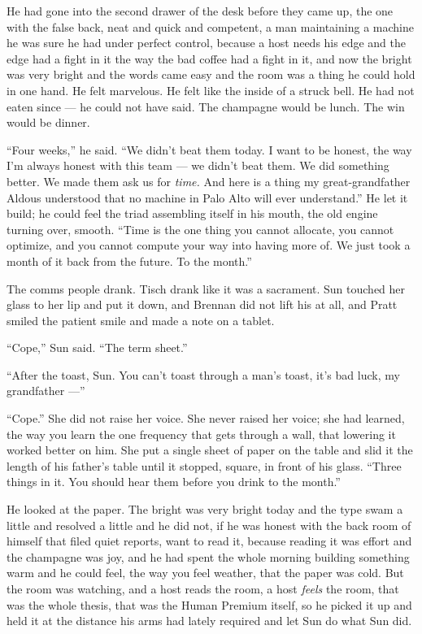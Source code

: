 \documentclass[11pt,openany]{book}
\begin{document}
He had gone into the second drawer of the desk before they came up, the one with the false back, neat and quick and competent, a man maintaining a machine he was sure he had under perfect control, because a host needs his edge and the edge had a fight in it the way the bad coffee had a fight in it, and now the bright was very bright and the words came easy and the room was a thing he could hold in one hand. He felt marvelous. He felt like the inside of a struck bell. He had not eaten since --- he could not have said. The champagne would be lunch. The win would be dinner.

``Four weeks,'' he said. ``We didn't beat them today. I want to be honest, the way I'm always honest with this team --- we didn't beat them. We did something better. We made them ask us for \textit{time.} And here is a thing my great-grandfather Aldous understood that no machine in Palo Alto will ever understand.'' He let it build; he could feel the triad assembling itself in his mouth, the old engine turning over, smooth. ``Time is the one thing you cannot allocate, you cannot optimize, and you cannot compute your way into having more of. We just took a month of it back from the future. To the month.''

The comms people drank. Tisch drank like it was a sacrament. Sun touched her glass to her lip and put it down, and Brennan did not lift his at all, and Pratt smiled the patient smile and made a note on a tablet.

``Cope,'' Sun said. ``The term sheet.''

``After the toast, Sun. You can't toast through a man's toast, it's bad luck, my grandfather ---''

``Cope.'' She did not raise her voice. She never raised her voice; she had learned, the way you learn the one frequency that gets through a wall, that lowering it worked better on him. She put a single sheet of paper on the table and slid it the length of his father's table until it stopped, square, in front of his glass. ``Three things in it. You should hear them before you drink to the month.''

He looked at the paper. The bright was very bright today and the type swam a little and resolved a little and he did not, if he was honest with the back room of himself that filed quiet reports, want to read it, because reading it was effort and the champagne was joy, and he had spent the whole morning building something warm and he could feel, the way you feel weather, that the paper was cold. But the room was watching, and a host reads the room, a host \textit{feels} the room, that was the whole thesis, that was the Human Premium itself, so he picked it up and held it at the distance his arms had lately required and let Sun do what Sun did.
\end{document}

